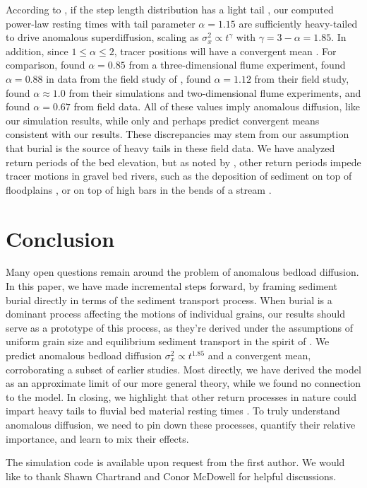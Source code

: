 \documentclass[draft]{agujournal2018}
\begin{document}
According to \citet{Weeks1998}, if the step length distribution has a light tail \citep[e.g.][]{Hassan2013}, our computed power-law resting times with tail parameter $\alpha = 1.15$ are sufficiently heavy-tailed to drive anomalous superdiffusion, scaling as $\sigma_x^2 \propto t^\gamma$ with $\gamma = 3 - \alpha = 1.85$.
In addition, since $1 \leq \alpha \leq 2$, tracer positions will have a convergent mean \citep[e.g.][]{Weeks1998, Bradley2017}.
For comparison, \citet{Martin2012} found $\alpha = 0.85$ from a three-dimensional flume experiment,  \citet{Voepel2013} found $\alpha = 0.88$ in data from the field study of \citet{Habersack2001},
\citet{Phillips2013} found $\alpha = 1.12$ from their field study, \citet{Martin2014} found $\alpha \approx 1.0$ from their simulations and two-dimensional flume experiments, and \citet{Bradley2017} found $\alpha = 0.67$ from field data. 
All of these values imply anomalous diffusion, like our simulation results, while only \citet{Phillips2013} and perhaps \citet{Martin2014} predict convergent means consistent with our results.
These discrepancies may stem from our assumption that burial is the source of heavy tails in these field data. 
We have analyzed return periods of the bed elevation, but as noted by \citet{Bradley2017}, 
other return periods impede tracer motions in gravel bed rivers, such as the deposition of sediment on top of floodplains \citep[e.g.][]{Bradley2013}, or on top of high bars in the bends of a stream \citep[e.g.][]{Bradley2017}.




\section{Conclusion}


Many open questions remain around the problem of anomalous bedload diffusion.
In this paper, we have made incremental steps forward, by framing sediment burial directly in terms of the sediment transport process.
When burial is a dominant process affecting the motions of individual grains, our results should serve as a prototype of this process, as they're derived under the assumptions of uniform grain size and equilibrium sediment transport in the spirit of \citet{Einstein1950}.
We predict anomalous bedload diffusion $\sigma_x^2 \propto t^{1.85}$ and a convergent mean, corroborating a subset of earlier studies.
Most directly, we have derived the \citet{Martin2014} model as an approximate limit of our more general theory, while we found no connection to the \citet{Voepel2013} model.
In closing, we highlight that other return processes in nature could impart heavy tails to fluvial bed material resting times \citep[e.g.][]{Bradley2017}.
To truly understand anomalous diffusion, we need to pin down these processes, quantify their relative importance, and learn to mix their effects.



\acknowledgments
The simulation code is available upon request from the first author. We would like to thank Shawn Chartrand and Conor McDowell for helpful discussions. 


\end{document}
